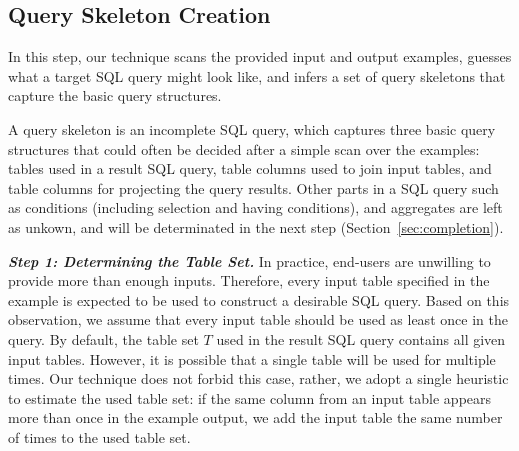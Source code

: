 \subsection{Query Skeleton Creation}
\label{sec:skeleton}

In this step, our technique scans the provided input and output examples, guesses
what a target SQL query might look like, and infers a set of query skeletons
that capture the basic query structures.

A query skeleton is an incomplete SQL query, which
captures three basic query structures that could
often be decided after a simple scan over the examples:
tables used in a result SQL
query, table columns used to join input tables, and table
columns for projecting the query results. Other parts in a SQL query such as conditions
(including selection and having conditions), and aggregates
are left as unkown, and will be determinated in the next step (Section~\ref{sec:completion}).




\vspace{1mm}
\noindent \textit{\textbf{Step 1: Determining the Table Set.}} 
In practice, end-users are unwilling to provide more than enough
inputs. Therefore, every input table specified in the example
is expected to be used to construct a desirable SQL query.
Based on this observation, we assume that every input table
should be used as least once in the query. By default, the
table set $T$ used in the result SQL query contains all given input tables.
However, it is possible that a single table will be used for multiple times.
Our technique does not forbid this case, rather, we adopt a single heuristic
to estimate the used table set: if the same column from an input table appears more than once in the
example output, we add the input table the same number of times to the used table set.



